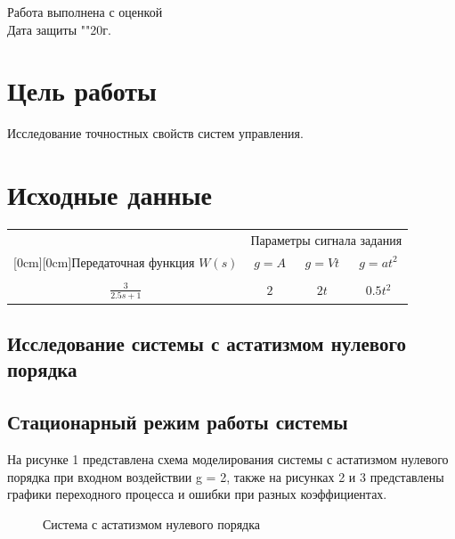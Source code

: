 \documentclass[a4paper, 11pt]{article}
\begin{document}
\begin{titlepage}
		Работа выполнена с оценкой \hspace{0.5cm} \underline{\hspace{10cm}} \\ 
		\vspace{1cm}
		Дата защиты "\underline{\hspace{0.4cm}}"\hspace{0.1cm}\underline{\hspace{1.5cm}}\hspace{0.1cm}20\underline{\hspace{0.4cm}}г.
		
	\end{titlepage}
\section*{Цель работы}Исследование точностных свойств систем управления.

\section*{Исходные данные}

\begin{tabular}{cccc}
	& \multicolumn{3}{c}{Параметры сигнала задания} \\
	\raisebox{1.5ex}[0cm][0cm]{Передаточная функция $W(s)$}
	& $g = A$ & $g = Vt$ & $g = at^2$ \\
	\hline\\
	$\frac{3} {2.5s+1}$ & $2$ & $2t$ & $0.5t^2$ \\
\end{tabular}

\newpage

\begin{center}
\section{Исследование системы с астатизмом нулевого порядка}
\end{center}
\subsection{Стационарный режим работы системы} На рисунке 1 представлена схема моделирования системы с астатизмом нулевого порядка при входном воздействии g = 2, также на рисунках 2 и 3 представлены графики переходного процесса и ошибки при разных коэффициентах.

\begin{figure}[h]
    \caption{Система с астатизмом нулевого порядка}
    \label{one}
\end{figure}
\end{document}
